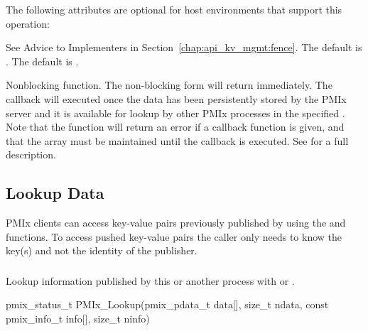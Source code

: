 \optattrstart
The following attributes are optional for host environments that support this operation:

See Advice to Implementers in Section~\ref{chap:api_kv_mgmt:fence}.
\pastePRIAttributeItemEnd
{}
The default is .
\pastePRIAttributeItemEnd
{}
The default is .
\pastePRIAttributeItemEnd

\optattrend

\descr

Nonblocking  function. The non-blocking form will return immediately. The callback will executed once the data has been persistently stored by the \ac{PMIx} server and it is available for lookup by other \ac{PMIx} processes in the specified .
Note that the function will return an error if a  callback function is given, and that the  array must be maintained until the callback is executed. See  for a full description.


\subsection{Lookup Data}
\label{chap:api_kv_mgmt:lookup}

\ac{PMIx} clients can access key-value pairs previously published by using the  and  functions.
To access pushed key-value pairs the caller only needs to know the key(s) and not the identity of the publisher.

\subsubsection{}

\summary

Lookup information published by this or another process with  or .

\format

\cspecificstart
\begin{codepar}
pmix_status_t
PMIx_Lookup(pmix_pdata_t data[], size_t ndata,
            const pmix_info_t info[], size_t ninfo)
\end{codepar}
\cspecificend

